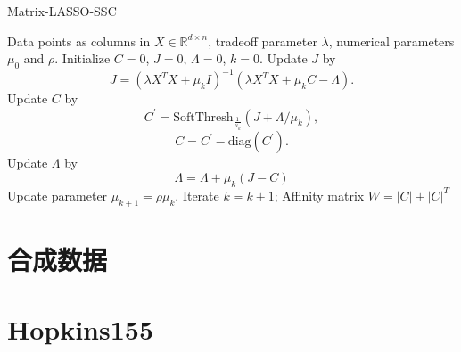 \documentclass[main.tex]{subfiles}
\begin{document}
\begin{algorithm}[tb]
   \caption{Matrix-LASSO-SSC}
   \label{alg:MatrixSSC}
\begin{algorithmic}
   Data points as columns in $X\in \mathbb{R}^{d\times n}$, tradeoff parameter $\lambda$, numerical parameters $\mu_0$ and $\rho$.
   \STATE Initialize $C=0$, $J=0$, $\Lambda=0$, $k=0$.
    Update $J$ by
   $$J=(\lambda X^TX+\mu_k I)^{-1}(\lambda X^TX+\mu_k C-\Lambda).$$
    Update $C$ by
   $$ C^{'}=\mathrm{SoftThresh}_{\frac{1}{\mu_k}}\left(J+\Lambda/\mu_k\right), $$
   $$ C=C^{'}-\mathrm{diag}(C^{'}).$$
    Update $\Lambda$ by
   $$\Lambda=\Lambda+\mu_k(J-C)$$
    Update parameter $\mu_{k+1}=\rho\mu_k.$
    Iterate $k=k+1$;
   \ENDWHILE
    Affinity matrix $W=|C|+|C|^T$
\end{algorithmic}
\end{algorithm}

\section{合成数据}
\section{Hopkins155}
\end{document}
